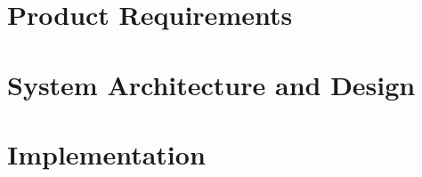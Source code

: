 \documentclass[hidelinks]{report}
\begin{document}
	\maketitle
	\tableofcontents
	
	\chapter{Product Requirements}\label{chp:requirements}
	\thispagestyle{fancy}
	
	
	\chapter{System Architecture and Design}\label{chp:design}
	\thispagestyle{fancy}
	
	
	\chapter{Implementation}\label{chp:implementation}
	\thispagestyle{fancy}
	





\end{document}
